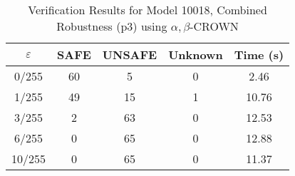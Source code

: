 \begin{table}[htbp]
\centering
\caption{Verification Results for Model 10018, Combined Robustness (p3) using $\alpha,\beta$-CROWN}
\label{tab:model10018_p3_abcrown}
\begin{tabular}{|c|c|c|c|c|}
\hline
$\varepsilon$ & SAFE & UNSAFE & Unknown & Time (s) \\ \hline
0/255 & 60 & 5 & 0 & 2.46 \\ \hline
1/255 & 49 & 15 & 1 & 10.76 \\ \hline
3/255 & 2 & 63 & 0 & 12.53 \\ \hline
6/255 & 0 & 65 & 0 & 12.88 \\ \hline
10/255 & 0 & 65 & 0 & 11.37 \\ \hline
\end{tabular}
\end{table}
